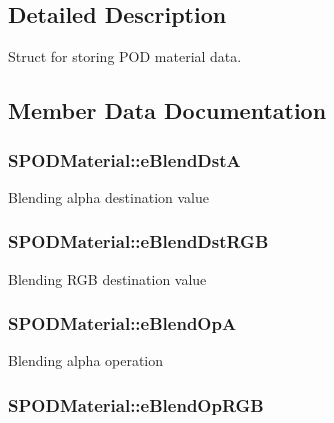 \subsection{Detailed Description}
Struct for storing P\+O\+D material data. 



 

\subsection{Member Data Documentation}
\hypertarget{struct_s_p_o_d_material_afe1dae1727cc45de5d26b30b9611b35f}{
\subsubsection[{e\+Blend\+Dst\+A}]{ S\+P\+O\+D\+Material\+::e\+Blend\+Dst\+A}}\label{struct_s_p_o_d_material_afe1dae1727cc45de5d26b30b9611b35f}
Blending alpha destination value \hypertarget{struct_s_p_o_d_material_a2ad6b962ba13e3a6f06645edf91670db}{
\subsubsection[{e\+Blend\+Dst\+R\+G\+B}]{ S\+P\+O\+D\+Material\+::e\+Blend\+Dst\+R\+G\+B}}\label{struct_s_p_o_d_material_a2ad6b962ba13e3a6f06645edf91670db}
Blending R\+G\+B destination value \hypertarget{struct_s_p_o_d_material_a3ca81bd7f5c69fd9dbd894439ec58f4d}{
\subsubsection[{e\+Blend\+Op\+A}]{ S\+P\+O\+D\+Material\+::e\+Blend\+Op\+A}}\label{struct_s_p_o_d_material_a3ca81bd7f5c69fd9dbd894439ec58f4d}
Blending alpha operation \hypertarget{struct_s_p_o_d_material_ad560b2b94ed9c1facc0a2365362fd041}{
\subsubsection[{e\+Blend\+Op\+R\+G\+B}]{ S\+P\+O\+D\+Material\+::e\+Blend\+Op\+R\+G\+B}}\label{struct_s_p_o_d_material_ad560b2b94ed9c1facc0a2365362fd041}
